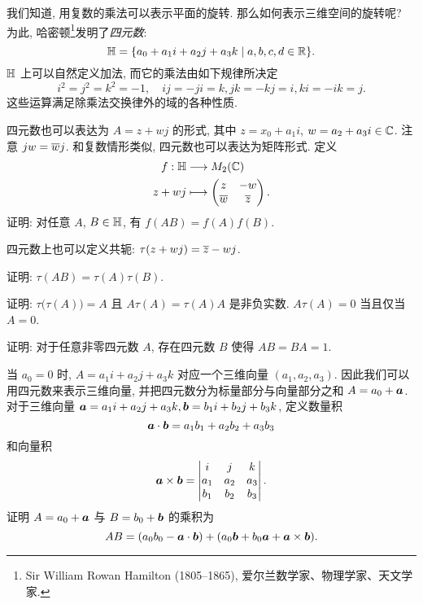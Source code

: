 我们知道, 用复数的乘法可以表示平面的旋转.
那么如何表示三维空间的旋转呢?
为此, 哈密顿\footnote{
  Sir William Rowan Hamilton (1805--1865), 爱尔兰数学家、物理学家、天文学家.}发明了\emph{四元数}:
\[
  {\mathbb{H}}=\{a_0+a_1i+a_2j+a_3k\mid a,b,c,d\in{\mathbb{R}}\}.
\]
${\mathbb{H}}$ 上可以自然定义加法, 而它的乘法由如下规律所决定
\[i^2=j^2=k^2=-1,\quad ij=-ji=k,jk=-kj=i,ki=-ik=j.\]
这些运算满足除乘法交换律外的域的各种性质.
\begin{subex}
  \item 四元数也可以表达为 $A=z+wj$ 的形式, 其中 $z=x_0+a_1i$, $w=a_2+a_3i\in{\mathbb{C}}$.
  注意 $jw=\overline wj$.
  和复数情形类似, 四元数也可以表达为矩阵形式.
  定义
  \begin{align*}
    f:{\mathbb{H}}&\longrightarrow M_2({\mathbb{C}})\\
    z+wj&\longmapsto \begin{pmatrix}
      z&-w\\\overline w&\overline z\end{pmatrix}.
  \end{align*}
  证明: 对任意 $A$, $B\in{\mathbb{H}}$, 有 $f(AB)=f(A)f(B)$.
  \item 四元数上也可以定义共轭: $\tau(z+wj)=\overline z-wj$.
  \begin{subex}
    \item 证明: $\tau(AB)=\tau(A)\tau(B)$.
    \item 证明: $\tau\bigl(\tau(A)\bigr)=A$ 且 $A\tau(A)=\tau(A)A$ 是非负实数. $A\tau(A)=0$ 当且仅当 $A=0$. 
    \item 证明: 对于任意非零四元数 $A$, 存在四元数 $B$ 使得 $AB=BA=1$. 
  \end{subex}
  \item 当 $a_0=0$ 时, $A=a_1i+a_2j+a_3k$ 对应一个三维向量 $(a_1,a_2,a_3)$.
  因此我们可以用四元数来表示三维向量, 并把四元数分为标量部分与向量部分之和 $A=a_0+{\boldsymbol{a}}$.
  对于三维向量 ${\boldsymbol{a}}=a_1i+a_2j+a_3k, {\boldsymbol{b}}=b_1i+b_2j+b_3k$, 定义数量积
  \[{\boldsymbol{a}}\cdot{\boldsymbol{b}}=a_1b_1+a_2b_2+a_3b_3\]
  和向量积
  \[{\boldsymbol{a}}\times{\boldsymbol{b}}=\begin{vmatrix}
    i&j&k\\
    a_1&a_2&a_3\\
    b_1&b_2&b_3
  \end{vmatrix}.\]
  证明 $A=a_0+{\boldsymbol{a}}$ 与 $B=b_0+{\boldsymbol{b}}$ 的乘积为
  \[AB=(a_0b_0-{\boldsymbol{a}}\cdot{\boldsymbol{b}})+(a_0{\boldsymbol{b}}+b_0{\boldsymbol{a}}+{\boldsymbol{a}}\times{\boldsymbol{b}}).\]

\end{subex}
